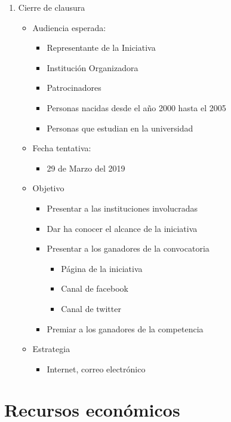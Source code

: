 \documentclass{article}
\begin{document}
\begin{enumerate}
\item Cierre de clausura
\begin{itemize}
\item Audiencia esperada:
\begin{itemize}
\item Representante de la Iniciativa
\item Institución Organizadora
\item Patrocinadores
\item Personas nacidas desde el año 2000 hasta el 2005
\item Personas que estudian en la universidad
\end{itemize}
\item Fecha tentativa:
\begin{itemize}
\item 29 de Marzo del 2019
\end{itemize}
\item Objetivo
\begin{itemize}
\item Presentar a las instituciones involucradas
\item Dar ha conocer el alcance de la iniciativa
\item Presentar a los ganadores de la convocatoria
\begin{itemize}
\item Página de la iniciativa 
\item Canal de facebook
\item Canal de twitter
\end{itemize}
\item Premiar a los ganadores de la competencia
\end{itemize}
\item Estrategia
\begin{itemize}
\item Internet, correo electrónico
\end{itemize}
\end{itemize}
\end{enumerate}


\section{Recursos económicos}
\end{document}
